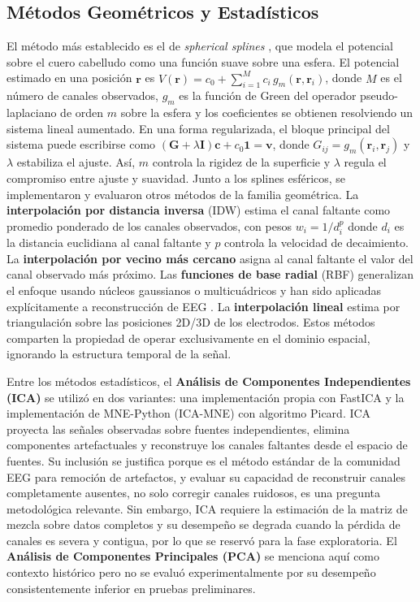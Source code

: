 \subsection{Métodos Geométricos y Estadísticos}

El método más establecido es el de \textit{spherical splines} \cite{perrin1989}, que modela el potencial sobre el cuero cabelludo como una función suave sobre una esfera. El potencial estimado en una posición $\mathbf{r}$ es $\hat{V}(\mathbf{r}) = c_0 + \sum_{i=1}^{M} c_i \, g_m(\mathbf{r}, \mathbf{r}_i)$, donde $M$ es el número de canales observados, $g_m$ es la función de Green del operador pseudo-laplaciano de orden $m$ sobre la esfera y los coeficientes se obtienen resolviendo un sistema lineal aumentado. En una forma regularizada, el bloque principal del sistema puede escribirse como $(\mathbf{G} + \lambda \mathbf{I})\mathbf{c} + c_0\mathbf{1}=\mathbf{v}$, donde $G_{ij}=g_m(\mathbf{r}_i,\mathbf{r}_j)$ y $\lambda$ estabiliza el ajuste. Así, $m$ controla la rigidez de la superficie y $\lambda$ regula el compromiso entre ajuste y suavidad.
Junto a los splines esféricos, se implementaron y evaluaron otros métodos de la familia geométrica. La \textbf{interpolación por distancia inversa} (IDW) estima el canal faltante como promedio ponderado de los canales observados, con pesos $w_i = 1/d_i^p$ donde $d_i$ es la distancia euclidiana al canal faltante y $p$ controla la velocidad de decaimiento. La \textbf{interpolación por vecino más cercano} asigna al canal faltante el valor del canal observado más próximo. Las \textbf{funciones de base radial} (RBF) generalizan el enfoque usando núcleos gaussianos o multicuádricos y han sido aplicadas explícitamente a reconstrucción de EEG \cite{jager2016rbf}. La \textbf{interpolación lineal} estima por triangulación sobre las posiciones 2D/3D de los electrodos. Estos métodos comparten la propiedad de operar exclusivamente en el dominio espacial, ignorando la estructura temporal de la señal.

Entre los métodos estadísticos, el \textbf{Análisis de Componentes Independientes (ICA)} \cite{jung2001imaging} se utilizó en dos variantes: una implementación propia con FastICA y la implementación de MNE-Python (ICA-MNE) con algoritmo Picard. ICA proyecta las señales observadas sobre fuentes independientes, elimina componentes artefactuales y reconstruye los canales faltantes desde el espacio de fuentes. Su inclusión se justifica porque es el método estándar de la comunidad EEG para remoción de artefactos, y evaluar su capacidad de reconstruir canales completamente ausentes, no solo corregir canales ruidosos, es una pregunta metodológica relevante. Sin embargo, ICA requiere la estimación de la matriz de mezcla sobre datos completos y su desempeño se degrada cuando la pérdida de canales es severa y contigua, por lo que se reservó para la fase exploratoria. El \textbf{Análisis de Componentes Principales (PCA)} se menciona aquí como contexto histórico pero no se evaluó experimentalmente por su desempeño consistentemente inferior en pruebas preliminares.
